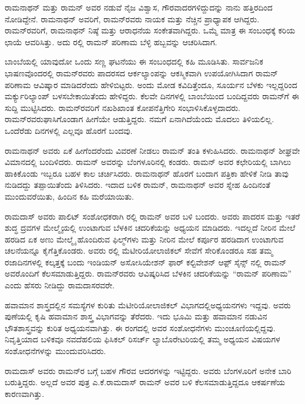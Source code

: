 ರಾಮನಾಥನ್ ಮತ್ತು ರಾಮನ್ ಅವರ ನಡುವೆ ನೈಜ ವಿಶ್ವಾಸ, ಗೌರವಾದರಗಳಿದ್ದುದನ್ನು ನಾನು ಹತ್ತಿರದಿಂದ ನೋಡಿದ್ದೇನೆ. ರಾಮನಾಥನ್ ಅವರಿಗೆ, ರಾಮನ್‍ರವರು ನಾಯಕ ಮತ್ತು ನೆಚ್ಚಿನ ಪ್ರಾಧ್ಯಾಪಕ ಆಗಿದ್ದರು. ರಾಮನ್‍ರವರಿಗೆ, ರಾಮನಾಥನ್ ನಿಷ್ಠೆ ಮತ್ತು ಆರಾಧನೆಯ ಸಂಕೇತವಾಗಿದ್ದರು. ಒಮ್ಮೆ ಮಾತ್ರ ಈ ಸಂಬಂಧಕ್ಕೆ ಕರಿಯ ಛಾಯೆ ಆವರಿಸಿತ್ತು. ಅದು ರಲ್ಲಿ ರಾಮನ್ ಪರಿಣಾಮ ಬೆಳ್ಳಿ ಹಬ್ಬವನ್ನು ಆಚರಿಸಿದಾಗ.

ಬಾಂಬೆಯಲ್ಲಿ ಯಾವುದೋ ಒಂದು ಸಣ್ಣ ಘಟನೆಯು ಈ ಸಂಬಂಧದಲ್ಲಿ ಕಹಿ ಮೂಡಿಸಿತು. ಸಾರ್ವಜನಿಕ ಭಾಷಣವೊಂದರಲ್ಲಿ ರಾಮನ್‍ರವರು ಪಾದರಸದ ಆರ್ಕಲ್ಯಾಂಪನ್ನು ಆಕಸ್ಮಿಕವಾಗಿ ಉಪಯೋಗಿಸಿದಾಗ ರಾಮನ್ ಪರಿಣಾಮ ಆವಿಷ್ಕಾರ ಮಾಡಿದರೆಂದು ಹೇಳಿಬಿಟ್ಟರು. ಅಂದು ಮೋಡ ಕವಿದಿತ್ತೆಂದೂ, ಸೂರ್ಯನ ಬೆಳಕು ಇಲ್ಲದ್ದರಿಂದ ಮರ್ಕ್ಯುರಿಲ್ಯಾಂಪ್ ಬಳಸಬೇಕಾಯಿತೆಂದು ಹೇಳಿದ್ದರು. ಕೆಲವೇ ದಿನಗಳಲ್ಲಿ ಬಾಂಬೆಯಿಂದ ಬಂದಿದ್ದವರು ರಾಮನ್‍ಗೆ ಈ ಸುದ್ದಿ ಮುಟ್ಟಿಸಿದರು. ರಾಮನ್‍ರವರಿಗೆ ನಖಶಿಖಾಂತ ಕೋಪನೆತ್ತಿಗೇರಿ ಸಂಭಾಳಿಸಿಕೊಳ್ಳದಾದರು. ರಾಮನ್‍ರವರು\break ಘಾಸಿಗೊಂಡಾಗ ಹೀಗೆಯೇ ಆಡುತ್ತಿದ್ದರು. ನಮಗೆ ಏನಾಗಿದೆಯೆಂದು ಮೊದಲು ತಿಳಿಯಲಿಲ್ಲ. ಒಂದೆರೆಡು ದಿನಗಳಲ್ಲಿ ಎಲ್ಲವೂ ಹೊರಗೆ ಬಂದವು.

ರಾಮನಾಥನ್ ಅವರು ಏಕೆ ಹೀಗೆಂದರೆಂದು ವಿವರಣೆ ನೀಡಲು ರಾಮನ್ ತಂತಿ ಕಳುಹಿಸಿದರು. ರಾಮನಾಥನ್ ಶೀಘ್ರವೇ ವಿಮಾನದಲ್ಲಿ ಬಂದಿಳಿದರು. ರಾಮನ್ ಅವರನ್ನು ಬೆಂಗಳೂರಿನಲ್ಲಿ ಕಂಡರು. ರಾಮನ್ ಅವರ ಕಛೇರಿಯಲ್ಲಿ ಬಾಗಿಲು ಹಾಕಿಕೊಂಡು ಇಬ್ಬರೂ ಬಹಳ ಕಾಲ ಚರ್ಚಿಸಿದರು. ರಾಮನಾಥನ್ ಹೊರಗೆ ಬಂದಾಗ ಪತ್ರಿಕಾ ಹೇಳಿಕೆ ನೀಡಿ ತಾವು ನುಡಿದದ್ದು ತಪ್ಪಾಯಿತೆಂದು ತಿಳಿಸಿದರು. ಇದಾದ ಬಳಿಕ ರಾಮನ್, ರಾಮನಾಥನ್ ಅವರ ಸ್ನೇಹ ಹಿಂದಿನಂತೆ ಮುಂದುವರೆಯಿತು, ಹಿಂದಿನ ಕಹಿ ಮರೆಯಾಯಿತು.



ರಾಮದಾಸ್ ಅವರು ಪಾಲಿಟ್ ಸಂಶೋಧಕರಾಗಿ ರಲ್ಲಿ ರಾಮನ್ ಅವರ ಬಳಿ ಬಂದರು. ಅವರು ಪಾದರಸ ಮತ್ತು ಇತರೆ ಶುದ್ಧ ದ್ರವಗಳ ಮೇಲ್ಮೈಯಲ್ಲಿ ಉಂಟಾಗುವ ಬೆಳಕಿನ ಚದರಿಕೆಯನ್ನು ಅಧ್ಯಯನ ಮಾಡಿದರು. ಇದಲ್ಲದೆ ನೀರಿನ ಮೇಲೆ ಹರಡಿದ ಏಕ ಅಣು ಮೇಲ್ಮೈ ಹೊಂದಿರುವ ಫಿಲ್ಮ್‌ಗಳು ಮತ್ತು ನೀರಿನ ಮೇಲೆ ಕರ್ಪೂರ ಹರಡಿದಾಗ ಉಂಟಾಗುವ ಚಲನೆಯನ್ನೂ ಕೈಗೆತ್ತಿಕೊಂಡರು. ಅವರು ರಲ್ಲಿ ಮೆಟೀರಿಯೋಲಾಜಿಕಲ್ ಸೇವೆಗೆ ಸೇರಿಕೊಂಡರೂ ಸಹ ತಮ್ಮ ರಜಾದಿನಗಳಲ್ಲಿ ಕಲ್ಕತ್ತಕ್ಕೆ ಬಂದು ಇಂಡಿಯನ್ ಅಸೋಸಿಯೇಶನ್ ಫಾರ್ ಕಲ್ಟಿವೇಶನ್ ಆಫ಼್ ಸೈನ್ಸ್ ನಲ್ಲಿ ರಾಮನ್ ಅವರೊಂದಿಗೆ ಕೆಲಸಮಾಡುತ್ತಿದ್ದರು. ರಾಮನ್‍ರವರು ಆವಿಷ್ಕರಿಸಿದ ಬೆಳಕಿನ ಚದರಿಕೆಯನ್ನು “ರಾಮನ್ ಪರಿಣಾಮ” ಎಂದು ಹೆಸರು ನೀಡಿದ್ದು ರಾಮದಾಸರವರೇ.

ಹವಾಮಾನ ಶಾಸ್ತ್ರದಲ್ಲಿನ ಸಮಸ್ಯೆಗಳ ಕುರಿತು ಮೆಟೀರಿಯೋಲಾಜಿಕಲ್ ವಿಭಾಗದಲ್ಲಿ\break ಅಧ್ಯಯನಗಳು ಇದ್ದವು. ಅವರು ಪುಣೆಯಲ್ಲಿ ಕೃಷಿ ಹವಾಮಾನ ಶಾಸ್ತ್ರ ವಿಭಾಗವನ್ನು ತೆರೆದರು. ಇದು ಭೂಮಿ ಮತ್ತು ಹವಾಮಾನ ನಡುವಿನ ಭೌತಶಾಸ್ತ್ರವನ್ನು ಕುರಿತ ಅಧ್ಯಯನವಾಗಿತ್ತು. ಈ ರಂಗದಲ್ಲಿ ಅವರ ಸಂಶೋಧನೆಗಳು ಮುಂಚೂಣಿಯಲ್ಲಿದ್ದವು. ನಿವೃತ್ತಿಯಾದ ಬಳಿಕವೂ ನವದೆಹಲಿಯ ಫಿಸಿಕಲ್ ರಿಸರ್ಚ್ ಲ್ಯಾಬೊರೇಟರಿಯಲ್ಲಿ ತಮ್ಮ ಅಧ್ಯಯನ ವಿಷಯಗಳ ಸಂಶೋಧನೆಗಳನ್ನು ಮುಂದುವರಿಸಿದರು.

ರಾಮದಾಸ್ ಅವರು ರಾಮನ್‍ರ ಬಗ್ಗೆ ಬಹಳ ಗೌರವ ಆದರಗಳನ್ನು ಇಟ್ಟಿದ್ದರು. ಅವರು ಬೆಂಗಳೂರಿಗೆ ಅನೇಕ ಬಾರಿ ಬರುತ್ತಿದ್ದರು. ಅಲ್ಲದೆ ಅವರ ಪುತ್ರ ಎ.ಕೆ.ರಾಮದಾಸ್ ರಾಮನ್ ಅವರ ಬಳಿ ಕೆಲಸಮಾಡುತ್ತಿದ್ದದೂ ಆಕರ್ಷಣೆಯ ಕಾರಣವಾಗಿತ್ತು.

